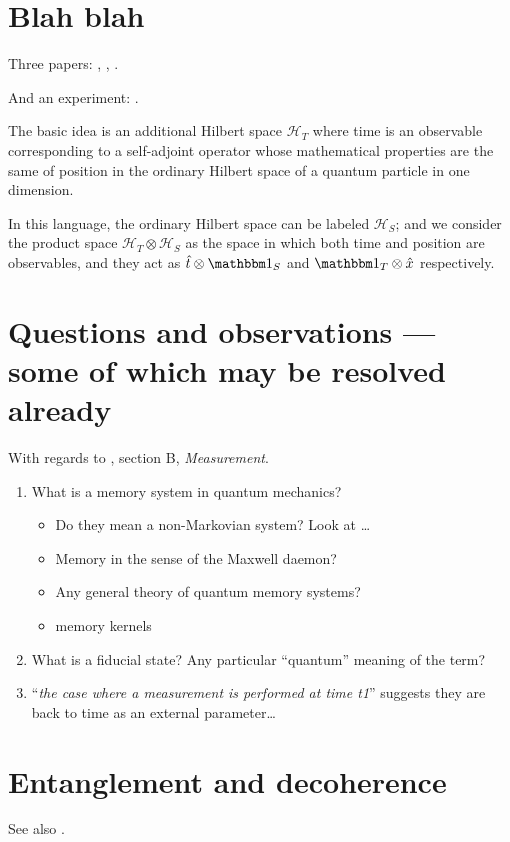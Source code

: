 \section{Blah blah}

Three papers: \cite{Lloyd:Time}, \cite{Marletto:Evolution}, \cite{Prvanovic}.

And an experiment: \cite{Moreva:synthetic,Moreva:illustration}.

The basic idea is an additional Hilbert space $\mathcal{H}_T$ where time is an observable
corresponding to
a self-adjoint operator whose mathematical properties are the same of position in the
ordinary Hilbert space of a quantum particle in one dimension.

In this language, the ordinary Hilbert space can be labeled $\mathcal{H}_S$;
and we consider the product space $\mathcal{H}_T \otimes \mathcal{H}_S$ as
the space in which both time and position are observables, and they act as
$\hat{t} \otimes \idop_S$ and $\idop_T \otimes \hat{x}$
respectively.

\section{Questions and observations --- some of which may be resolved already}

With regards to \cite{Lloyd:Time}, section B, \textit{Measurement}.

\begin{enumerate}
  \item What is a memory system in quantum mechanics? 
  \begin{itemize}
    \item Do they mean a non-Markovian system? Look at \cite{MeasurementMarkovian}\dots
    \item Memory in the sense of the Maxwell daemon?
    \item Any general theory of quantum memory systems?
    \item memory kernels \cite{CarmichaelOQS2017}
  \end{itemize}
  \item What is a fiducial state? Any particular ``quantum'' meaning of the term?
  \item ``\emph{the case where a measurement is performed at time t1}'' suggests they are back to time as an external parameter\dots
\end{enumerate}


\section{Entanglement and decoherence}
See also \cite{EntanglementVsDecoherence}.

